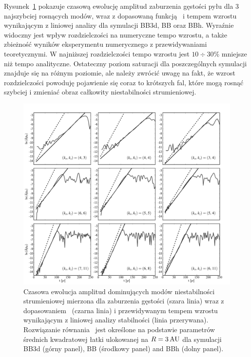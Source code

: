 \par Rysunek~\ref{fig8} pokazuje czasową ewolucję amplitud zaburzenia gęstości
pyłu dla 3 najszybciej rosnących modów, wraz z dopasowaną funkcją~
i tempem wzrostu wynikającym z liniowej analizy dla symulacji BB3d, BB oraz BBh.
Wyraźnie widoczny jest wpływ rozdzielczości na numeryczne tempo wzrostu, a także
zbieżność wyników eksperymentu numerycznego z przewidywaniami teoretycznymi. W
najniższej rozdzielczości tempo wzrostu jest $10\div30\%$ mniejsze niż tempo
analityczne. Ostateczny poziom saturacji dla poszczególnych symulacji znajduje
się na różnym poziomie, ale należy zwrócić uwagę na fakt, że wzrost
rozdzielczości powoduję pojawienie się coraz to krótszych fal, które mogą rosnąć
szybciej i zmieniać obraz całkowity niestabilności strumieniowej.
 
\begin{figure} \includegraphics[width=0.98\linewidth]{figures/fig8}
   \caption{Czasowa ewolucja amplitud dominujących modów niestabilności
      strumieniowej mierzona dla zaburzenia gęstości (szara linia) wraz z
      dopasowaniem~ (czarna linia) i przewidywanym tempem wzrostu
      wynikającym z liniowej analizy stabilności (linia przerywana).
      Rozwiązanie równania~ jest określone na podstawie
      parametrów średnich kwadratowej łatki ulokowanej na $R=3\hbox{$\thinspace\textrm{AU}$}$ dla symulacji
BB3d (górny panel), BB (środkowy panel) and BBh (dolny panel).  } \label{fig8}
\end{figure}

